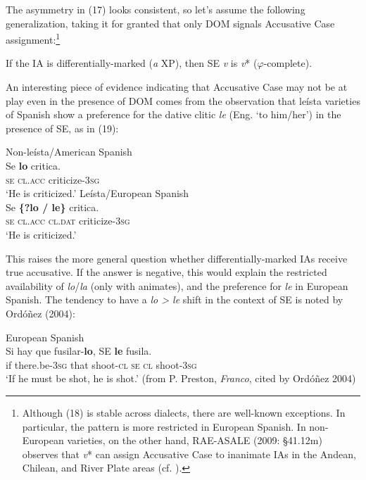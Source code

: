 \documentclass[output=paper]{langsci/langscibook}
\begin{document}
The asymmetry in (17) looks consistent, so let’s assume the following generalization, taking it for granted that only DOM signals Accusative Case assignment:\footnote{Although (18) is stable across dialects, there are well-known exceptions. In particular, the pattern is more restricted in European Spanish. In non-European varieties, on the other hand, RAE-ASALE (2009: §41.12m) observes that \textit{v}* can assign Accusative Case to inanimate IAs in the Andean, Chilean, and River Plate areas (cf. \citealt{Gallego2016}).}

\ea%
\label{ex:gallego:18}
If the IA is differentially-marked (\textit{a} XP), then SE \textit{v} is \textit{v}* ($\varphi $-complete).
\z

          

An interesting piece of evidence indicating that Accusative Case may not be at play even in the presence of DOM comes from the observation that leísta varieties of Spanish show a preference for the dative clitic \textit{le} (Eng. ‘to him/her’) in the presence of SE, as in (19):

\ea%
    \ea
    Non-leísta/American Spanish\label{ex:gallego:19}\\
    \gll Se  \textbf{lo}       critica.          \\
              \textsc{se  cl.acc} criticize\textsc{{}-3}\textsc{sg}\\
    \glt      ‘He is criticized.’
    \ex Leísta/European Spanish\\
    \gll Se \textbf{\{?lo    /    le\}}       critica.      \\
                 \textsc{se  cl.acc  cl.dat}   criticize\textsc{{}-3}\textsc{sg}\\
    \glt      ‘He is criticized.’
    \z
\z   

This raises the more general question whether differentially-marked IAs receive true accusative. If the answer is negative, this would explain the restricted availability of \textit{lo}/\textit{la} (only with animates), and the preference for \textit{le} in European Spanish. The tendency to have a \textit{lo > le} shift in the context of SE is noted by Ordóñez (2004):

\ea%
    European Spanish\label{ex:gallego:20}\\
    \gll Si hay                 que  fusilar-\textbf{lo},  SE \textbf{le} fusila.\\
        if  there.be\textsc{{}-3}\textsc{sg}  that  shoot\textsc{{}-cl  se  cl}  shoot\textsc{{}-3}\textsc{sg}\\
    \glt ‘If he must be shot, he is shot.’ (from P. Preston, \textit{Franco}, cited by Ordóñez 2004)
    \z
\end{document}
